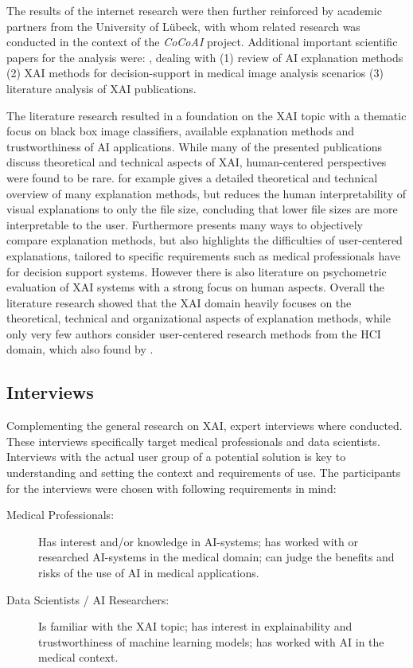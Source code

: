 \documentclass[11pt,a4paper,english]{scrreprt}
\begin{document}
The results of the internet research were then further reinforced by academic partners from the University of Lübeck, with whom related research was conducted in the context of the \textit{CoCoAI} project. Additional important scientific papers for the analysis were: \textcite{arrieta_explainable_2019,knapic_explainable_2021,samek_explaining_2021}, dealing with (1) review of AI explanation methods (2) XAI methods for decision-support in medical image analysis scenarios (3) literature analysis of XAI publications.

The literature research resulted in a foundation on the XAI topic with a thematic focus on black box image classifiers, available explanation methods and trustworthiness of AI applications. While many of the presented publications discuss theoretical and technical aspects of XAI, human-centered perspectives were found to be rare. \textcite{samek_explaining_2021} for example gives a detailed theoretical and technical overview of many explanation methods, but reduces the human interpretability of visual  explanations to only the file size, concluding that lower file sizes are more interpretable to the user. Furthermore \textcite{ras_explainable_2021} presents many ways to objectively compare explanation methods, but also highlights the difficulties of user-centered explanations, tailored to specific requirements such as medical professionals have for decision support systems. However there is also literature on psychometric evaluation of XAI systems \parencite{hoffman_metrics_2019} with a strong focus on human aspects. Overall the literature research showed that the XAI domain heavily focuses on the theoretical, technical and organizational aspects of explanation methods, while only very few authors consider user-centered research methods from the HCI domain, which also found by \textcite{mueller_explanation_2019}.

\subsection{Interviews}\label{subsection:interviews}
Complementing the general research on XAI, expert interviews where conducted. These interviews specifically target medical professionals and data scientists. Interviews with the actual user group of a potential solution is key to understanding and setting the context and requirements of use. The participants for the interviews were chosen with following requirements in mind:

\begin{description}
    \item[Medical Professionals:] Has interest and/or knowledge in AI-systems; has worked with or researched AI-systems in the medical domain; can judge the benefits and risks of the use of AI in medical applications.
    \item[Data Scientists / AI Researchers:] Is familiar with the XAI topic; has interest in explainability and trustworthiness of machine learning models; has worked with AI in the medical context.
\end{description}
\end{document}
